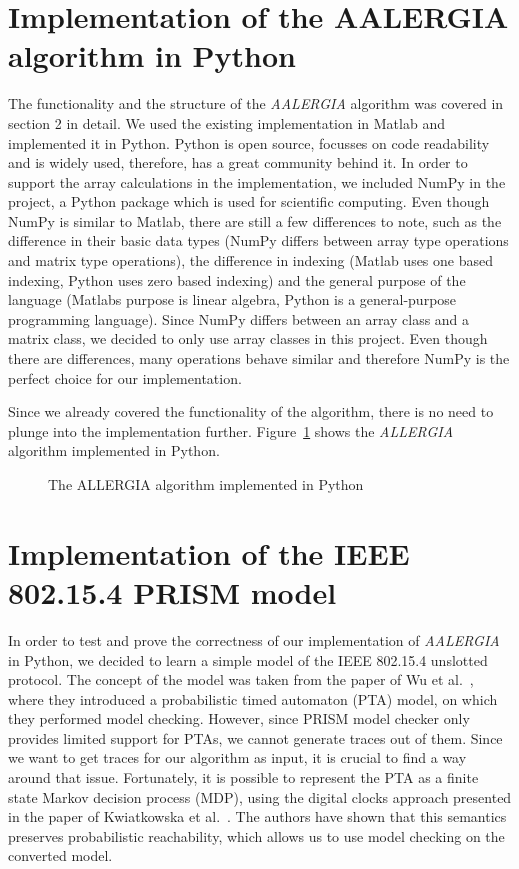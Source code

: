 \documentclass[
a4paper,
12pt
]{scrartcl}
\begin{document}
\section{Implementation of the AALERGIA algorithm in Python}
The functionality and the structure of the \emph{AALERGIA} algorithm was covered in section 2 in detail. We used the existing implementation in Matlab and implemented it in Python. Python is open source, focusses on code readability and is widely used, therefore, has a great community behind it. In order to support the array calculations in the implementation, we included NumPy in the project, a Python package which is used for scientific computing. Even though NumPy is similar to Matlab, there are still a few differences to note, such as the difference in their basic data types (NumPy differs between array type operations and matrix type operations), the difference in indexing (Matlab uses one based indexing, Python uses zero based indexing) and the general purpose of the language (Matlabs purpose is linear algebra, Python is a general-purpose programming language). Since NumPy differs between an array class and a matrix class, we decided to only use array classes in this project. Even though there are differences, many operations behave similar and therefore NumPy is the perfect choice for our implementation.

Since we already covered the functionality of the algorithm, there is no need to plunge into the implementation further. Figure~\ref{fig:allergiaPythonCode} shows the \emph{ALLERGIA} algorithm implemented in Python.

\begin{figure}[H]

\caption{The ALLERGIA algorithm implemented in Python}
\label{fig:allergiaPythonCode}
\end{figure}

\section{Implementation of the IEEE 802.15.4 PRISM model}
In order to test and prove the correctness of our implementation of \emph{AALERGIA} in Python, we decided to learn a simple model of the IEEE 802.15.4 unslotted protocol. The concept of the model was taken from the paper of Wu et al.~\cite{stability}, where they introduced a probabilistic timed automaton (PTA) model, on which they performed model checking. However, since PRISM model checker only provides limited support for PTAs, we cannot generate traces out of them. Since we want to get traces for our algorithm as input, it is crucial to find a way  around that issue. Fortunately, it is possible to represent the PTA as a finite state Markov decision process (MDP), using the digital clocks approach presented in the paper of Kwiatkowska et al.~\cite{KNPS06}. The authors have shown that this semantics preserves probabilistic reachability, which allows us to use model checking on the converted model.
\end{document}

